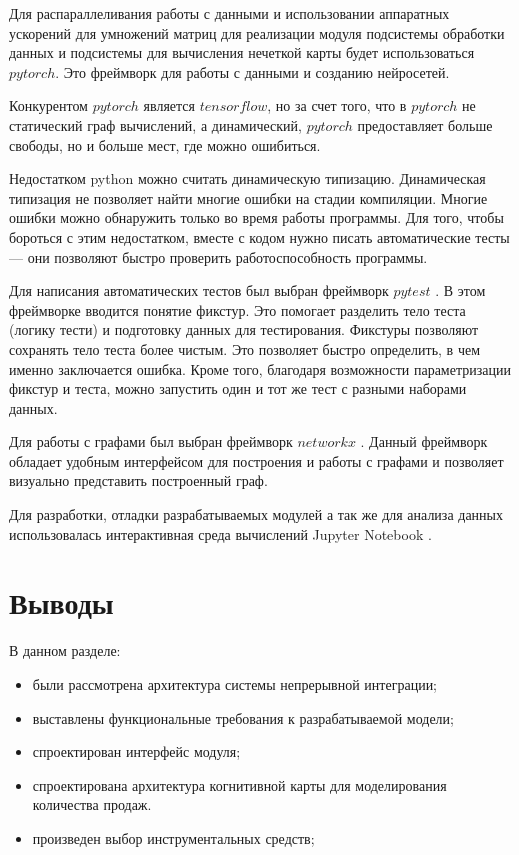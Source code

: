 Для распараллеливания работы с данными и использовании аппаратных ускорений для умножений матриц
для реализации модуля подсистемы обработки данных и подсистемы для вычисления нечеткой карты
будет использоваться $pytorch$. Это фреймворк для работы с данными и созданию нейросетей.

Конкурентом $pytorch$ является $tensorflow$, но за счет того, что в $pytorch$ не статический
граф вычислений, а динамический, $pytorch$ предоставляет больше свободы, но и больше мест,
где можно ошибиться.

Недостатком python можно считать динамическую типизацию. Динамическая типизация не позволяет
найти многие ошибки на стадии компиляции. Многие ошибки можно обнаружить только во время
работы программы. Для того, чтобы бороться с этим недостатком, вместе с кодом нужно писать
автоматические тесты --- они позволяют быстро проверить работоспособность программы.

Для написания автоматических тестов был выбран фреймворк $ pytest $ \cite{pytestx.y}. В этом фреймворке
вводится понятие фикстур. Это помогает разделить тело теста (логику тести) и
подготовку данных для тестирования. Фикстуры позволяют сохранять тело
теста более чистым. Это позволяет быстро определить, в чем именно заключается ошибка.
Кроме того, благодаря возможности параметризации фикстур и теста, можно
запустить один и тот же тест с разными наборами данных.

Для работы с графами был выбран фреймворк $ networkx $ \cite{hagberg-2008-exploring}. Данный фреймворк
обладает удобным интерфейсом для построения и работы с графами и
позволяет визуально представить построенный граф.

Для разработки, отладки разрабатываемых модулей а так же для
анализа данных использовалась интерактивная среда вычислений Jupyter Notebook \cite{Kluyver:2016aa}.


\section{Выводы}

В данном разделе:

\begin{itemize}
	\item были рассмотрена архитектура системы непрерывной интеграции;
	\item выставлены функциональные требования к разрабатываемой модели;
	\item спроектирован интерфейс модуля;
	\item спроектирована архитектура когнитивной карты для моделирования количества продаж.
	\item произведен выбор инструментальных средств;
\end{itemize}

